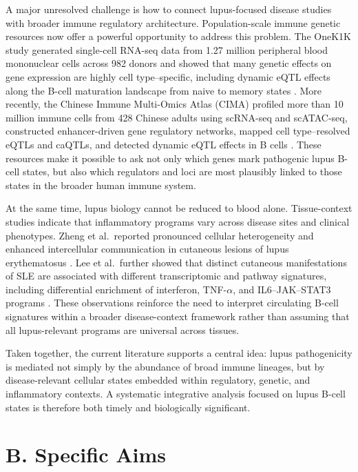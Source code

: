 \documentclass[12pt, a4paper]{article}
\begin{document}
A major unresolved challenge is how to connect lupus-focused disease studies with broader immune regulatory architecture. Population-scale immune genetic resources now offer a powerful opportunity to address this problem. The OneK1K study generated single-cell RNA-seq data from 1.27 million peripheral blood mononuclear cells across 982 donors and showed that many genetic effects on gene expression are highly cell type--specific, including dynamic eQTL effects along the B-cell maturation landscape from naive to memory states \cite{Yazar2022}. More recently, the Chinese Immune Multi-Omics Atlas (CIMA) profiled more than 10 million immune cells from 428 Chinese adults using scRNA-seq and scATAC-seq, constructed enhancer-driven gene regulatory networks, mapped cell type--resolved eQTLs and caQTLs, and detected dynamic eQTL effects in B cells \cite{Yin2026}. These resources make it possible to ask not only which genes mark pathogenic lupus B-cell states, but also which regulators and loci are most plausibly linked to those states in the broader human immune system.

At the same time, lupus biology cannot be reduced to blood alone. Tissue-context studies indicate that inflammatory programs vary across disease sites and clinical phenotypes. Zheng et al.\ reported pronounced cellular heterogeneity and enhanced intercellular communication in cutaneous lesions of lupus erythematosus \cite{Zheng2022}. Lee et al.\ further showed that distinct cutaneous manifestations of SLE are associated with different transcriptomic and pathway signatures, including differential enrichment of interferon, TNF-$\alpha$, and IL6--JAK--STAT3 programs \cite{Lee2025}. These observations reinforce the need to interpret circulating B-cell signatures within a broader disease-context framework rather than assuming that all lupus-relevant programs are universal across tissues.

Taken together, the current literature supports a central idea: lupus pathogenicity is mediated not simply by the abundance of broad immune lineages, but by disease-relevant cellular states embedded within regulatory, genetic, and inflammatory contexts. A systematic integrative analysis focused on lupus B-cell states is therefore both timely and biologically significant.

\section*{B. Specific Aims}
\end{document}
